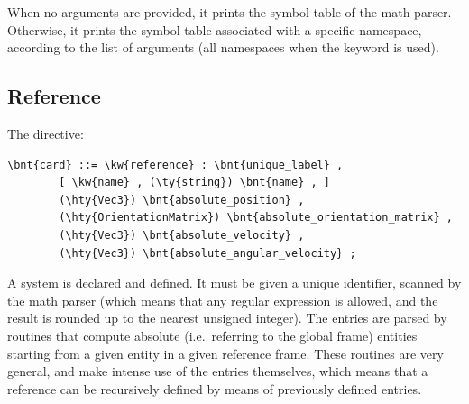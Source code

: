 When no arguments are provided, it prints the symbol table of the math parser.
Otherwise, it prints the symbol table associated with a specific namespace,
according to the list of arguments (all namespaces when the keyword  is used).



\subsection{Reference}
The  directive:
\begin{Verbatim}[commandchars=\\\{\}]
    \bnt{card} ::= \kw{reference} : \bnt{unique_label} , 
        [ \kw{name} , (\ty{string}) \bnt{name} , ]
        (\hty{Vec3}) \bnt{absolute_position} ,
        (\hty{OrientationMatrix}) \bnt{absolute_orientation_matrix} ,
        (\hty{Vec3}) \bnt{absolute_velocity} ,
        (\hty{Vec3}) \bnt{absolute_angular_velocity} ;
\end{Verbatim}
A  system is declared and defined.
It must be given a unique identifier, scanned by the math parser
(which means that any regular expression is allowed, and the result is
rounded up to the nearest unsigned integer).
The entries  are parsed by routines that
compute absolute (i.e.\ referring to the global frame) entities
starting from a given entity in a given reference frame.
These routines are very general, and make intense use of the 
 entries themselves, which means that a reference 
can be recursively defined by means of previously defined 
 entries.

\bigskip

